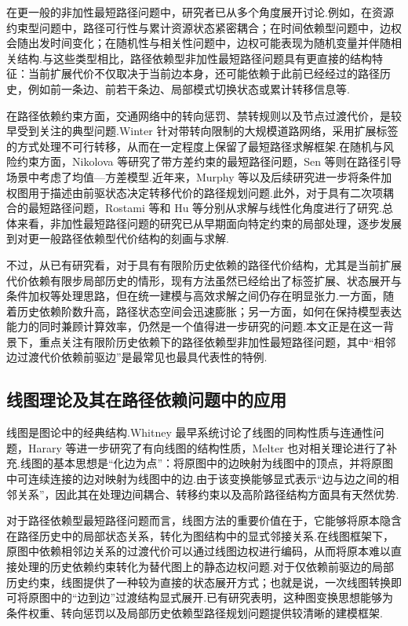 在更一般的非加性最短路径问题中，研究者已从多个角度展开讨论.例如，在资源约束型问题中，路径可行性与累计资源状态紧密耦合；在时间依赖型问题中，边权会随出发时间变化；在随机性与相关性问题中，边权可能表现为随机变量并伴随相关结构.与这些类型相比，路径依赖型非加性最短路径问题具有更直接的结构特征：当前扩展代价不仅取决于当前边本身，还可能依赖于此前已经经过的路径历史，例如前一条边、前若干条边、局部模式切换状态或累计转移信息等.

在路径依赖约束方面，交通网络中的转向惩罚、禁转规则以及节点过渡代价，是较早受到关注的典型问题.Winter 针对带转向限制的大规模道路网络，采用扩展标签的方式处理不可行转移，从而在一定程度上保留了最短路径求解框架\cite{winter2002labeling}.在随机与风险约束方面，Nikolova 等研究了带方差约束的最短路径问题\cite{nikoletta2010variance}，Sen 等则在路径引导场景中考虑了均值—方差模型\cite{sen2001mean}.近年来，Murphy 等以及后续研究进一步将条件加权图用于描述由前驱状态决定转移代价的路径规划问题\cite{murphy2018generalized}.此外，对于具有二次项耦合的最短路径问题，Rostami 等和 Hu 等分别从求解与线性化角度进行了研究\cite{rostami2015solving,hu2017polynomial}.总体来看，非加性最短路径问题的研究已从早期面向特定约束的局部处理，逐步发展到对更一般路径依赖型代价结构的刻画与求解.

不过，从已有研究看，对于具有有限阶历史依赖的路径代价结构，尤其是当前扩展代价依赖有限步局部历史的情形，现有方法虽然已经给出了标签扩展、状态展开与条件加权等处理思路，但在统一建模与高效求解之间仍存在明显张力.一方面，随着历史依赖阶数升高，路径状态空间会迅速膨胀；另一方面，如何在保持模型表达能力的同时兼顾计算效率，仍然是一个值得进一步研究的问题.本文正是在这一背景下，重点关注有限阶历史依赖下的路径依赖型非加性最短路径问题，其中“相邻边过渡代价依赖前驱边”是最常见也最具代表性的特例.

\subsection{线图理论及其在路径依赖问题中的应用}

线图是图论中的经典结构.Whitney 最早系统讨论了线图的同构性质与连通性问题\cite{whitney1932congruent}，Harary 等进一步研究了有向线图的结构性质\cite{harary1960some}，Melter 也对相关理论进行了补充\cite{melter1962interchange}.线图的基本思想是“化边为点”：将原图中的边映射为线图中的顶点，并将原图中可连续连接的边对映射为线图中的边.由于该变换能够显式表示“边与边之间的相邻关系”，因此其在处理边间耦合、转移约束以及高阶路径结构方面具有天然优势.

对于路径依赖型最短路径问题而言，线图方法的重要价值在于，它能够将原本隐含在路径历史中的局部状态关系，转化为图结构中的显式邻接关系.在线图框架下，原图中依赖相邻边关系的过渡代价可以通过线图边权进行编码，从而将原本难以直接处理的历史依赖约束转化为替代图上的静态边权问题.对于仅依赖前驱边的局部历史约束，线图提供了一种较为直接的状态展开方式；也就是说，一次线图转换即可将原图中的“边到边”过渡结构显式展开.已有研究表明，这种图变换思想能够为条件权重、转向惩罚以及局部历史依赖型路径规划问题提供较清晰的建模框架\cite{grandoni2008generalization,murphy2018generalized}.


